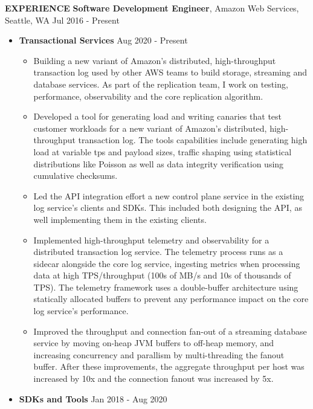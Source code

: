 \documentclass[10pt, letterpaper]{article}
\begin{document}
\textbf{EXPERIENCE}
\smallskip
\newline
\textbf{Software Development Engineer}, Amazon Web Services, Seattle, WA \hfill Jul 2016 - Present
\begin{itemize}
\item \textbf{Transactional Services} \hfill Aug 2020 - Present
  \begin{itemize}[label=$\bullet$]
    \item Building a new variant of Amazon's distributed, high-throughput transaction log used by other AWS teams to build storage, streaming
      and database services. As part of the replication team, I work on testing, performance, observability and the core replication 
      algorithm.
    \item Developed a tool for generating load and writing canaries that test customer workloads for a new variant of Amazon's distributed, 
      high-throughput transaction log. The tools capabilities include generating high load at variable tps and payload sizes, traffic shaping 
      using statistical distributions like Poisson as well as data integrity verification using cumulative checksums.
    \item Led the API integration effort a new control plane service in the existing log service's clients and SDKs. This included both designing
      the API, as well implementing them in the existing clients.
    \item Implemented high-throughput telemetry and observability for a distributed transaction log service. The telemetry process runs as a
      sidecar alongside the core log service, ingesting metrics when processing data at high TPS/throughput (100s of MB/s and 10s of thousands of TPS).
      The telemetry framework uses a double-buffer architecture using statically allocated buffers to prevent any performance impact on the core log
      service's performance.
    \item Improved the throughput and connection fan-out of a streaming database service by moving on-heap JVM buffers to off-heap memory, and increasing
      concurrency and parallism by multi-threading the fanout buffer. After these improvements, the aggregate throughput per host was increased by 10x and
      the connection fanout was increased by 5x.
  \end{itemize}
\item \textbf{SDKs and Tools} \hfill Jan 2018 - Aug 2020

\end{itemize}
\end{document}
